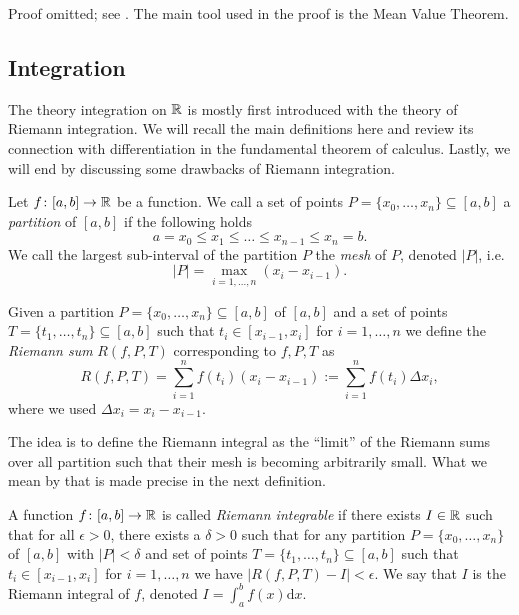 \documentclass{article}
\begin{document}
Proof omitted; see \cite[p.160-161]{realanalysis}. The main tool used in the proof is the Mean Value Theorem.

\subsection{Integration}

The theory integration on ${\mathbb{R}}$ is mostly first introduced with the theory of Riemann integration. We will recall the main definitions here and review its connection with differentiation in the fundamental theorem of calculus. Lastly, we will end by discussing some drawbacks of Riemann integration.

\begin{definition}
Let $f\colon [a,b] \to {\mathbb{R}}$ be a function. We call a set of points $P=\{x_0, \ldots, x_n\}\subseteq [a,b]$ a \emph{partition} of $[a,b]$ if the following holds
\begin{equation*}
    a = x_0 \leq x_1\leq \ldots \leq x_{n-1} \leq x_n = b.
\end{equation*}
We call the largest sub-interval of the partition $P$ the \emph{mesh} of $P$, denoted $|P|$, i.e.
$$ |P| = \max_{i=1,\ldots,n} ( x_i - x_{i-1} ).$$

Given a partition $P=\{x_0, \ldots, x_n\}\subseteq [a,b]$ of $[a,b]$ and a set of points $T=\{t_1,\ldots, t_n\}\subseteq [a,b]$ such that $t_i \in [x_{i-1},x_i]$ for $i=1,\ldots, n$ we define the \emph{Riemann sum} $R(f,P,T)$ corresponding to $f,P,T$ as 
\begin{equation*}
    R(f,P,T) = \sum_{i=1}^n f(t_i) (x_i-x_{i-1}) := \sum_{i=1}^n f(t_i) \Delta x_i,
\end{equation*}
where we used $ \Delta x_i = x_i-x_{i-1}$. 
\end{definition}

The idea is to define the Riemann integral as the ``limit'' of the Riemann sums over all partition such that their mesh is becoming arbitrarily small. What we mean by that is made precise in the next definition.

\begin{definition}
A function $f\colon [a,b] \to {\mathbb{R}}$ is called \emph{Riemann integrable} if there exists $I\in {\mathbb{R}}$ such that for all $\epsilon>0$, there exists a $\delta>0$ such that for any partition $P = \{x_0,\ldots,x_n \}$ of $[a,b]$ with $\vert P \vert <\delta$ and set of points $T=\{t_1,\ldots, t_n\}\subseteq [a,b]$ such that $t_i \in [x_{i-1},x_i]$ for $i=1,\ldots,n$ we have $\vert R(f,P,T) - I \vert < \epsilon$. We say that $I$ is the Riemann integral of $f$, denoted $I = \int_a^b f(x) \mathrm{d}x$.
\end{definition}
\end{document}
